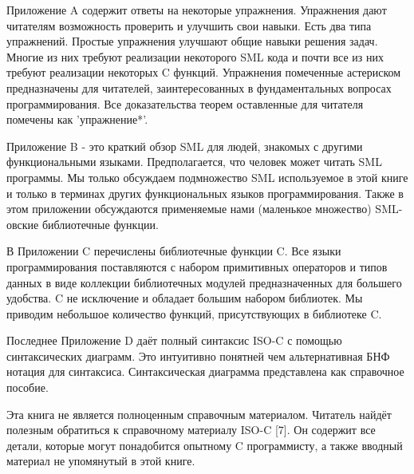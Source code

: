 Приложение A содержит ответы на некоторые упражнения. Упражнения дают читателям возможность проверить и улучшить свои навыки. Есть два типа упражнений. Простые упражнения улучшают общие навыки решения задач. Многие из них требуют реализации некоторого SML кода и почти все из них требуют реализации некоторых C функций. Упражнения помеченные астериском предназначены для читателей, заинтересованных в фундаментальных вопросах программирования. Все доказательства теорем оставленные для читателя помечены как 'упражнение*'.

Приложение B - это краткий обзор SML для людей, знакомых с другими функциональными языками. Предполагается, что человек может читать SML программы. Мы только обсуждаем подмножество SML используемое в этой книге и только в терминах других функциональных языков программирования. Также в этом приложении обсуждаются применяемые нами (маленькое множество) SML-овские библиотечные функции.

В Приложении C перечислены библиотечные функции C. Все языки программирования поставляются с набором примитивных операторов и типов данных в виде коллекции библиотечных модулей предназначенных для большего удобства. C не исключение и обладает большим набором библиотек. Мы приводим небольшое количество функций, присутствующих в библиотеке C.

Последнее Приложение D даёт полный синтаксис ISO-C с помощью синтаксических диаграмм. Это интуитивно понятней чем альтернативная БНФ нотация для синтаксиса. Синтаксическая диаграмма представлена как справочное пособие.

Эта книга не является полноценным справочным материалом. Читатель найдёт полезным обратиться к справочному материалу ISO-C [7]. Он содержит все детали, которые могут понадобится опытному C программисту, а также вводный материал не упомянутый в этой книге.

